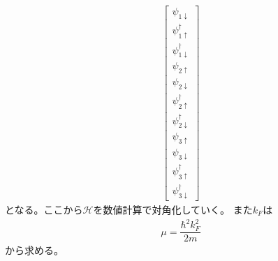 \documentclass{jarticle}
\begin{document}
\begin{align}
\begin{bmatrix}
\psi_{1\downarrow} \\ 
\psi_{1\uparrow}^\dagger \\ 
\psi_{1\downarrow}^\dagger \\ 
\psi_{2\uparrow} \\ 
\psi_{2\downarrow} \\ 
\psi_{2\uparrow}^\dagger \\ 
\psi_{2\downarrow}^\dagger \\ 
\psi_{3\uparrow} \\ 
\psi_{3\downarrow} \\ 
\psi_{3\uparrow}^\dagger \\ 
\psi_{3\downarrow}^\dagger
\end{bmatrix} 
\end{align}
となる。ここから$\mathcal{H}$を数値計算で対角化していく。
また$k_{F}$は
\begin{align}
\mu=\dfrac{\hbar^{2}k_F^{2}}{2m}
\end{align}
から求める。
\end{document}
